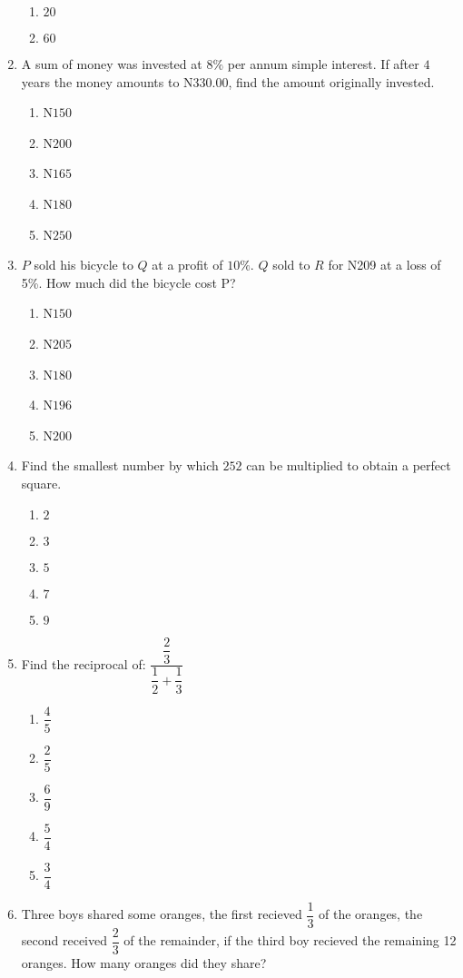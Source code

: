 \begin{multicols}{2}
\begin{enumerate}[label={\arabic*.}]
\begin{enumerate}[label={\Alph*.}]
    \item \(20\)
    \item \(60\)
    \end{enumerate}
\item A sum of money was invested at \(8\%\) per annum simple interest. If after \(4\) years the money amounts to N330.00, find the amount originally invested.
    \begin{enumerate}[label={\Alph*.}]
    \item N\(150\)
    \item N\(200\)
    \item N\(165\)
    \item N\(180\)
    \item N\(250\)
    \end{enumerate}
\item \(P\) sold his bicycle to \(Q\) at a profit of \(10\%\). \(Q\) sold to \(R\) for N209 at a loss of 5\%. How much did the bicycle cost P? 
    \begin{enumerate}[label={\Alph*.}]
    \item N\(150\)
    \item N\(205\)
    \item N\(180\)
    \item N\(196\)
    \item N\(200\)
    \end{enumerate}
\item Find the smallest number by which \(252\) can be multiplied to obtain a perfect square. 
    \begin{enumerate}[label={\Alph*.}]
    \item \(2\)
    \item \(3\)
    \item \(5\)
    \item \(7\)
    \item \(9\)
    \end{enumerate}
\item Find the reciprocal of: \(\dfrac{\dfrac{2}{3}}{\dfrac{1}{2} + \dfrac{1}{3}}\)
    \begin{enumerate}[label={\Alph*.}]
    \item \(\dfrac{4}{5}\)
    \item \(\dfrac{2}{5}\)
    \item \(\dfrac{6}{9}\)
    \item \(\dfrac{5}{4}\)
    \item \(\dfrac{3}{4}\)
    \end{enumerate}
\item Three boys shared some oranges, the first recieved \(\dfrac{1}{3}\) of the oranges, the second received \(\dfrac{2}{3}\) of the remainder, if the third boy recieved the remaining 12 oranges. How many oranges did they share?

\end{enumerate}
\end{multicols}
